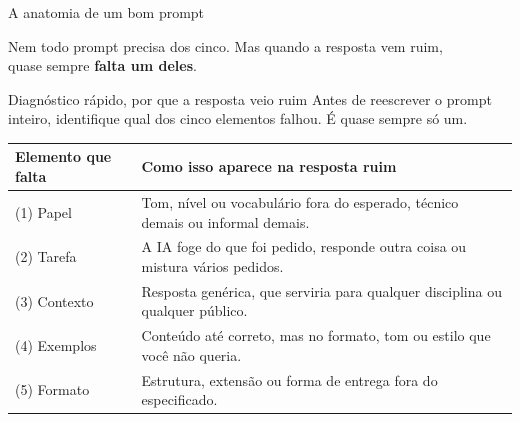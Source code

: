 \documentclass[11pt,aspectratio=169,t]{beamer}
\begin{document}
\begin{frame}{A anatomia de um bom prompt}
  \centering
  \pause
  \vfill
  \begin{block}{}
    \centering Nem todo prompt precisa dos cinco. Mas quando a resposta vem ruim, \\ quase sempre \textbf{falta um deles}.
  \end{block}
\end{frame}

\begin{frame}{Diagnóstico rápido, por que a resposta veio ruim}
  \small
  Antes de reescrever o prompt inteiro, identifique qual dos cinco elementos falhou. É quase sempre só um.
  \begin{center}
  \scriptsize
  \renewcommand{\arraystretch}{1.3}
  \begin{tabular}{p{2.6cm} p{9.6cm}}
    \toprule
    \textbf{Elemento que falta} & \textbf{Como isso aparece na resposta ruim} \\
    \midrule
    (1) Papel & Tom, nível ou vocabulário fora do esperado, técnico demais ou informal demais. \\
    (2) Tarefa & A IA foge do que foi pedido, responde outra coisa ou mistura vários pedidos. \\
    (3) Contexto & Resposta genérica, que serviria para qualquer disciplina ou qualquer público. \\
    (4) Exemplos & Conteúdo até correto, mas no formato, tom ou estilo que você não queria. \\
    (5) Formato & Estrutura, extensão ou forma de entrega fora do especificado. \\
    \bottomrule
  \end{tabular}
  \end{center}
\end{frame}
\end{document}
